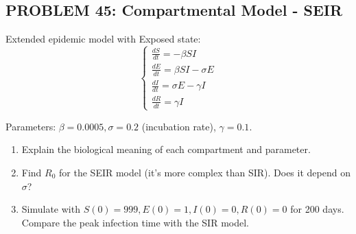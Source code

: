 \documentclass[12pt]{article}
\begin{document}
\subsection*{PROBLEM 45: Compartmental Model - SEIR}

Extended epidemic model with Exposed state:
\[
\begin{cases}
\frac{dS}{dt} = -\beta SI \\
\frac{dE}{dt} = \beta SI - \sigma E \\
\frac{dI}{dt} = \sigma E - \gamma I \\
\frac{dR}{dt} = \gamma I
\end{cases}
\]

Parameters: \(\beta = 0.0005, \sigma = 0.2\) (incubation rate), \(\gamma = 0.1\).

\begin{enumerate}
\item[(a)] Explain the biological meaning of each compartment and parameter.
\item[(b)] Find \(R_0\) for the SEIR model (it's more complex than SIR). Does it depend on \(\sigma\)?
\item[(c)] Simulate with \(S(0) = 999, E(0) = 1, I(0) = 0, R(0) = 0\) for 200 days. Compare the peak infection time with the SIR model.
\end{enumerate}
\end{document}
